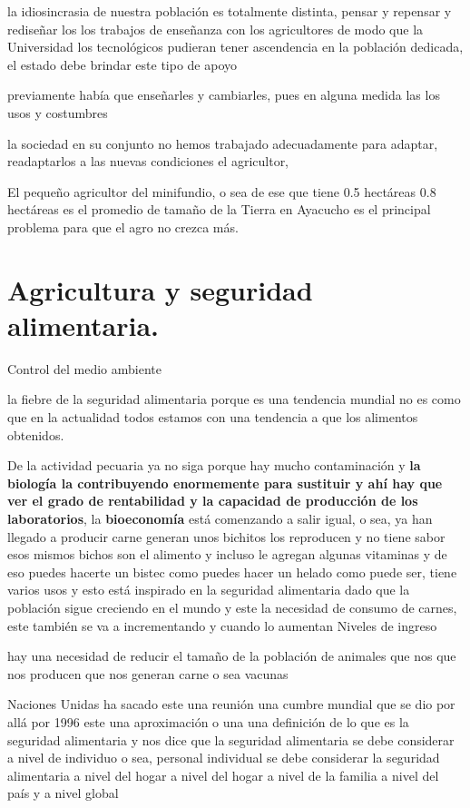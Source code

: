 \documentclass[
  letterpaper,
  DIV=11,
  numbers=noendperiod]{scrartcl}
\begin{document}
la idiosincrasia de nuestra población es totalmente distinta, pensar y
repensar y rediseñar los los trabajos de enseñanza con los agricultores
de modo que la Universidad los tecnológicos pudieran tener ascendencia
en la población dedicada, el estado debe brindar este tipo de apoyo

previamente había que enseñarles y cambiarles, pues en alguna medida las
los usos y costumbres

la sociedad en su conjunto no hemos trabajado adecuadamente para
adaptar, readaptarlos a las nuevas condiciones el agricultor,

El pequeño agricultor del minifundio, o sea de ese que tiene 0.5
hectáreas 0.8 hectáreas es el promedio de tamaño de la Tierra en
Ayacucho es el principal problema para que el agro no crezca más.

\hypertarget{agricultura-y-seguridad-alimentaria.}{%
\section{Agricultura y seguridad
alimentaria.}\label{agricultura-y-seguridad-alimentaria.}}

Control del medio ambiente

la fiebre de la seguridad alimentaria porque es una tendencia mundial no
es como que en la actualidad todos estamos con una tendencia a que los
alimentos obtenidos.

De la actividad pecuaria ya no siga porque hay mucho contaminación y
\textbf{la biología la contribuyendo enormemente para sustituir y ahí
hay que ver el grado de rentabilidad y la capacidad de producción de los
laboratorios}, la \textbf{bioeconomía} está comenzando a salir igual, o
sea, ya han llegado a producir carne generan unos bichitos los
reproducen y no tiene sabor esos mismos bichos son el alimento y incluso
le agregan algunas vitaminas y de eso puedes hacerte un bistec como
puedes hacer un helado como puede ser, tiene varios usos y esto está
inspirado en la seguridad alimentaria dado que la población sigue
creciendo en el mundo y este la necesidad de consumo de carnes, este
también se va a incrementando y cuando lo aumentan Niveles de ingreso

hay una necesidad de reducir el tamaño de la población de animales que
nos que nos producen que nos generan carne o sea vacunas

Naciones Unidas ha sacado este una reunión una cumbre mundial que se dio
por allá por 1996 este una aproximación o una una definición de lo que
es la seguridad alimentaria y nos dice que la seguridad alimentaria se
debe considerar a nivel de individuo o sea, personal individual se debe
considerar la seguridad alimentaria a nivel del hogar a nivel del hogar
a nivel de la familia a nivel del país y a nivel global
\end{document}
